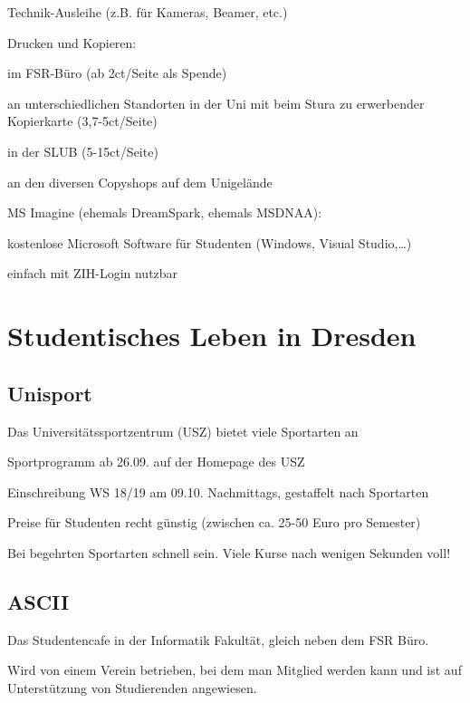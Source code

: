 \documentclass[a4paper,12pt]{report}
\begin{document}
\begin{itemize*}
\begin{itemize*}
        \item Technik-Ausleihe (z.B. für Kameras, Beamer, etc.)
    \end{itemize*}
    \item Drucken und Kopieren:
    \begin{itemize*}
        \item im FSR-Büro (ab 2ct/Seite als Spende)
        \item an unterschiedlichen Standorten in der Uni mit beim Stura zu erwerbender Kopierkarte (3,7-5ct/Seite)
        \item in der SLUB (5-15ct/Seite)
        \item an den diversen Copyshops auf dem Unigelände
    \end{itemize*}
    \item MS Imagine (ehemals DreamSpark, ehemals MSDNAA):
    \begin{itemize*}
        \item kostenlose Microsoft Software für Studenten (Windows, Visual Studio,\dots)
        \item einfach mit ZIH-Login nutzbar
    \end{itemize*}
\end{itemize*}

\section{Studentisches Leben in Dresden}

\subsection{Unisport}
Das Universitätssportzentrum (USZ) bietet viele Sportarten an
\begin{itemize*}
\item Sportprogramm ab 26.09. auf der Homepage des USZ
\item Einschreibung WS 18/19 am 09.10. Nachmittags, gestaffelt nach Sportarten
\item Preise für Studenten recht günstig (zwischen ca. 25-50 Euro pro Semester)
\item Bei begehrten Sportarten schnell sein. Viele Kurse nach wenigen Sekunden voll!
\end{itemize*}

\subsection{ASCII}
\begin{itemize*}
\item Das Studentencafe in der Informatik Fakultät, gleich neben dem FSR Büro.
\item Wird von einem Verein betrieben, bei dem man Mitglied werden kann und ist auf Unterstützung von Studierenden angewiesen.
\end{itemize*}
\end{document}
